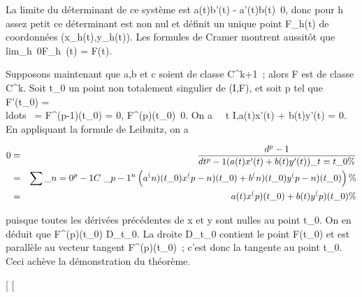 \documentclass[]{article}
\begin{document}
La limite du déterminant de ce système est a(t)b'(t) -
a'(t)b(t)\neq~0, donc pour h assez petit ce
déterminant est non nul et définit un unique point F\_h(t) de
coordonnées (x\_h(t),y\_h(t)). Les formules de Cramer
montrent aussitôt que
lim\_h\rightarrow~0F\_h~(t) = F(t).

Supposons maintenant que a,b et c soient de classe C^k+1~;
alors F est de classe C^k. Soit t\_0 un point non
totalement singulier de (I,F), et soit p tel que F'(t\_0) =
\\ldots~ =
F^(p-1)(t\_0) = 0,
F^(p)(t\_0)\neq~0. On a
\forall~~t \in I,a(t)x'(t) + b(t)y'(t) = 0. En
appliquant la formule de Leibnitz, on a

\begin{align*} 0& =& d^p-1
\over dt^p-1 (a(t)x'(t) +
b(t)y'(t))\_t=t\_0 \%& \\
& =& \sum \_n=0^p-1C~\_
p-1^n\left (a^(n)(t\_
0)x^(p-n)(t\_ 0) + b^(n)(t\_
0)y^(p-n)(t\_ 0)\right )\%&
\\ & =& a(t)x^(p)(t\_
0) + b(t)y^(p)(t\_ 0) \%&
\\ \end{align*}

puisque toutes les dérivées précédentes de x et y sont nulles au point
t\_0. On en déduit que F^(p)(t\_0)
\in\overrightarrow D\_t\_0. La droite
D\_t\_0 contient le point F(t\_0) et est
parallèle au vecteur tangent F^(p)(t\_0)~; c'est donc
la tangente au point t\_0. Ceci achève la démonstration du
théorème.

{[}
{[}
\end{document}
